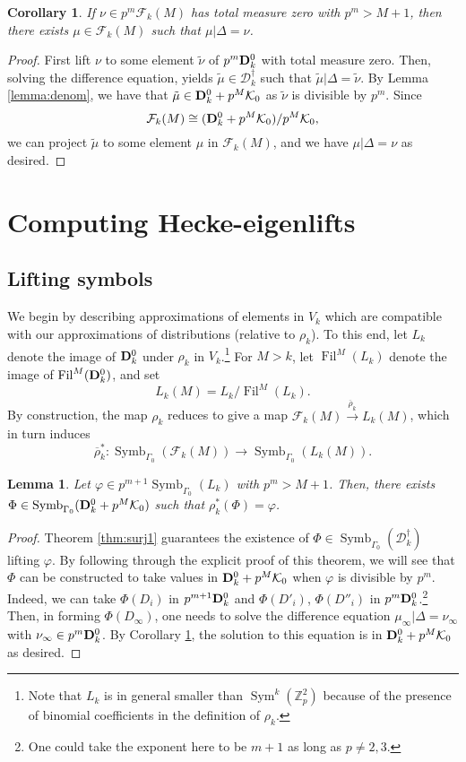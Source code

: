 \documentclass{amsart}
\theoremstyle{plain}
\newtheorem{lemma}[thm]{Lemma}
\newtheorem{cor}[thm]{Corollary}
\theoremstyle{definition}
\newcommand{\D}{{\mathcal D}}
\newcommand{\bD}{{\bf D}}
\newcommand{\F}{{\mathcal F}}
\newcommand{\K}{{\mathcal K}}
\newcommand{\Z}{{\mathbb Z}}
\newcommand{\Zp}{\Z_p}
\newcommand{\maps}{\rightarrow}
\newcommand{\lra}{\longrightarrow}
\newcommand{\ol}{\overline}
\renewcommand{\sp}{{\rho^*_k}}
\newcommand{\spd}{{\rho_k}}
\newcommand{\olsp}{{\ol{\rho}^*_k}}
\newcommand{\Dvrig}[1]{\bD_{#1}}
\newcommand{\Dkrig}{\Dvrig{k}}
\newcommand{\Dkoc}{\D_k^\dag}
\newcommand{\FkM}{\F_k(M)}
\DeclareMathOperator{\Symb}{Symb}
\DeclareMathOperator{\Sym}{Sym}
\DeclareMathOperator{\Fil}{Fil}
\newcommand{\MSo}[1]{\Symb_{\Gamma_0}(#1)}
\begin{document}
\begin{cor}
\label{cor:liftFM} 
If $\nu \in p^m \FkM$ has total measure zero with $p^m > M+1$, then there exists $\mu \in \FkM$ such that $\mu \big| \Delta = \nu$.
\end{cor}

\begin{proof}
First lift $\nu$ to some element $\tilde{\nu}$ of $p^m \Dkrig^0$ with total measure zero.  Then, solving the difference equation, yields $\tilde{\mu} \in \Dkoc$ such that $\tilde{\mu}\big| \Delta = \tilde{\nu}$.  By Lemma \ref{lemma:denom}, we have that $\tilde{\mu} \in \Dkrig^0 + p^M \K_0$ as $\tilde{\nu}$ is divisible by $p^m$.  Since
$$
\FkM \cong (\Dkrig^0 + p^M \K_0) / p^M \K_0,
$$ 
we can project $\tilde{\mu}$ to some element $\mu$ in $\FkM$, and we have $\mu \big| \Delta = \nu$ as desired.
\end{proof}

\section{Computing Hecke-eigenlifts}

\subsection{Lifting symbols}


We begin by describing approximations of elements in $V_k$ which are compatible with our approximations of distributions (relative to $\spd$). To this end, let $L_k$ denote the image of $\Dkrig^0$ under $\spd$ in $V_k$.\footnote{Note that $L_k$ is in general smaller than $\Sym^k(\Zp^2)$ because of the presence of binomial coefficients in the definition of $\spd$.} For $M>k$, let $\Fil^M(L_k)$ denote the image of $\Fil^M(\Dkrig^0)$, and set
$$
L_k(M) = L_k / \Fil^M(L_k).
$$
By construction, the map $\spd$ reduces to give a map $\FkM \stackrel{\ol{\rho}_k}{\lra} L_k(M)$, which in turn induces
$$
\olsp : \MSo{\FkM} \maps \MSo{L_k(M)}.
$$

\begin{lemma}
Let $\varphi \in p^{m+1} \MSo{L_k}$ with $p^m > M+1$.  Then, there exists $\Phi \in \MSo{\Dkrig^0+p^M \K_0}$ such that $\sp(\Phi)=\varphi$.
\end{lemma}

\begin{proof}
Theorem \ref{thm:surj1} guarantees the existence of $\Phi \in \MSo{\Dkoc}$ lifting $\varphi$.  By following through the explicit proof of this theorem, we will see that $\Phi$ can be constructed to take values in $\Dkrig^0+p^M\K_0$ when $\varphi$ is divisible by $p^m$.  Indeed, we can take $\Phi(D_i)$ in $p^{m+1} \Dkrig^0$ and $\Phi(D'_i)$, $\Phi(D''_i)$ in $p^m \Dkrig^0$.\footnote{One could take the exponent here to be $m+1$ as long as $p \neq 2,3$.}
  Then, in forming $\Phi(D_\infty)$, one needs to solve the difference equation $\mu_\infty \big| \Delta = \nu_\infty$ with $\nu_\infty \in p^m \Dkrig^0$.  By Corollary \ref{cor:liftFM}, the solution to this equation is in $\Dkrig^0 + p^M \K_0$ as desired.
\end{proof}
\end{document}
